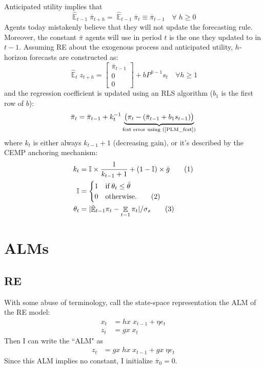 \documentclass[11pt]{article}
\renewcommand{\[}{\begin{equation}}
\renewcommand{\]}{\end{equation}}
\DeclareMathOperator{\E}{\mathbb{E}}
\newcommand\numberthis{\addtocounter{equation}{1}\tag{\theequation}} %
\begin{document}
Anticipated utility implies that
\begin{equation}
\hat{\E}_{t-1}{\bar{\pi}_{t+h}} = \hat{\E}_{t-1}{\bar{\pi}_{t}} \equiv \bar{\pi}_{t-1} \quad \forall \; h\geq0 
\end{equation}
Agents today mistakenly believe that they will not update the forecasting rule. Moreover, the constant $\bar{\pi}$ agents will use in period $t$ is the one they updated to in $t-1$.
Assuming RE about the exogenous process and anticipated utility, $h$-horizon forecasts are constructed as:
\begin{equation}
\hat{\E}_t z_{t+h} =  \begin{bmatrix}\bar{\pi}_{t-1} \\ 0 \\
 0 \end{bmatrix}+ bP^{h-1}s_t  \quad \forall h\geq 1 \label{PLM_fcst}
\end{equation}
and the regression coefficient is updated using an RLS algorithm ($b_1$ is the first row of $b$):
\begin{equation}
\bar{\pi}_{t} = \bar{\pi}_{t-1} +k_t^{-1}\underbrace{\big(\pi_{t} -(\bar{\pi}_{t-1}+b_1s_{t-1}) \big)}_{\text{fcst error using (\ref{PLM_fcst})} }
\end{equation}
where $k_t $ is either always $k_{t-1}+1$ (decreasing gain), or it's described by the CEMP anchoring mechanism:
 \begin{align*}
k_t &= \mathbb{I} \times \frac{1}{k_{t-1} +1} + (1-\mathbb{I})\times \bar{g} \label{gain} \numberthis\\
\mathbb{I} & = \begin{cases} 1 \quad \text{if} \; \theta_t \leq \bar{\theta}  \\ 0 \quad \text{otherwise.}\numberthis
\end{cases} \\
\theta_t & = |\hat{\E}_{t-1}\pi_t - \E_{t-1}\pi_t| / \sigma_s \label{criterion}\numberthis
\end{align*}

\section{ALMs}
\subsection{RE}
With some abuse of terminology, call the state-space representation the ALM of the RE model:
\begin{align}
x_{t} & = hx \; x_{t-1} + \eta e_t \label{state_eq}\\
z_t & = gx \; x_t \label{obs_eq}
\end{align}
Then I can write the ``ALM" as
\begin{align}
z_t & = gx \; hx \; x_{t-1} + gx \; \eta e_t  \label{ALM_RE}
\end{align}
Since this ALM implies no constant, I initialize $\bar{\pi}_0 = 0$. 
\end{document}
